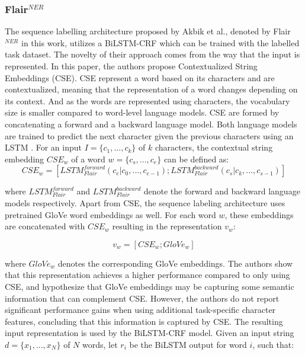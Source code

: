 \documentclass{report}
\theoremstyle{definition}
\theoremstyle{remark}
\begin{document}
\subsubsection{Flair$^{NER}$}
The sequence labelling architecture proposed by Akbik et al., denoted by Flair$^{NER}$ in this work, utilizes a BiLSTM-CRF \cite{BiLSTMCRF} which can be trained with the labelled task dataset. The novelty of their approach comes from the way that the input is represented. In this paper, the authors propose Contextualized String Embeddings (CSE). CSE represent a word based on its characters and are contextualized, meaning that the representation of a word changes depending on its context. And as the words are represented using characters, the vocabulary size is smaller compared to word-level language models. CSE are formed by concatenating a forward and a backward language model. Both language models are trained to predict the next character given the previous characters using an LSTM \cite{lstm}. For an input $I=\{c_1,...,c_k\}$ of $k$ characters, the contextual string embedding $CSE_w$ of a word $w=\{c_s,...,c_e\}$ can be defined as:
\begin{equation}
    CSE_w = [ LSTM^{forward}_{Flair}(c_e | c_0,...,c_{e-1}); LSTM^{backward}_{Flair}(c_s | c_k,...,c_{s-1}) ]
\end{equation}

\noindent where $LSTM^{forward}_{Flair}$ and $LSTM^{backward}_{Flair}$ denote the forward and backward language models respectively. Apart from CSE, the sequence labeling architecture uses pretrained GloVe \cite{glove} word embeddings as well. For each word $w$, these embeddings are concatenated with $CSE_w$ resulting in the representation $v_w$:

\begin{equation}
    v_w = [CSE_w;GloVe_w]
\end{equation}

\noindent where $GloVe_w$ denotes the corresponding GloVe embeddings. The authors show that this representation achieves a higher performance compared to only using CSE, and hypothesize that GloVe embeddings may be capturing some semantic information that can complement CSE. However, the authors do not report significant performance gains when using additional task-specific character features, concluding that this information is captured by CSE. The resulting input representation is used by the BiLSTM-CRF model. Given an input string $d=\{x_1,...,x_N\}$ of $N$ words, let $r_i$ be the BiLSTM output for word $i$, such that:
\end{document}
